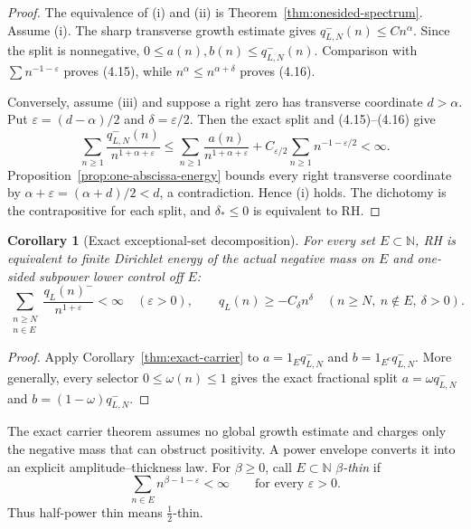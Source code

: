 \documentclass[11pt]{article}
\newtheorem{corollary}[theorem]{Corollary}
\newcommand{\N}{\mathbb N}
\begin{document}
\begin{proof}
The equivalence of (i) and (ii) is Theorem~\ref{thm:onesided-spectrum}.  Assume (i).  The sharp
transverse growth estimate gives $q_{L,N}^-(n)\le Cn^\alpha$.  Since the split is nonnegative,
$0\le a(n),b(n)\le q_{L,N}^-(n)$.  Comparison with $\sum n^{-1-\varepsilon}$ proves
\textup{(4.15)}, while $n^\alpha\le n^{\alpha+\delta}$ proves \textup{(4.16)}.

Conversely, assume (iii) and suppose a right zero has transverse coordinate $d>\alpha$.  Put
$\varepsilon=(d-\alpha)/2$ and $\delta=\varepsilon/2$.  Then the exact split and
\textup{(4.15)}--\textup{(4.16)} give
\[
 \sum_{n\ge1}\frac{q_{L,N}^-(n)}{n^{1+\alpha+\varepsilon}}
 \le
 \sum_{n\ge1}\frac{a(n)}{n^{1+\alpha+\varepsilon}}
 +C_{\varepsilon/2}\sum_{n\ge1}n^{-1-\varepsilon/2}<\infty.
 \tag{4.17}
\]
Proposition~\ref{prop:one-abscissa-energy} bounds every right transverse coordinate by
$\alpha+\varepsilon=(\alpha+d)/2<d$, a contradiction.  Hence (i) holds.  The dichotomy is the
contrapositive for each split, and $\delta_*\le0$ is equivalent to RH.
\end{proof}

\begin{corollary}[Exact exceptional-set decomposition]\label{cor:exceptional-carrier}
For every set $E\subset\N$, RH is equivalent to finite Dirichlet energy of the actual negative
mass on $E$ and one-sided subpower lower control off $E$:
\[
 \sum_{\substack{n\ge N\\n\in E}}
   \frac{q_L(n)^-}{n^{1+\varepsilon}}<\infty
 \quad(\varepsilon>0),
 \qquad
 q_L(n)\ge-C_\delta n^\delta
 \quad(n\ge N,\ n\notin E,\ \delta>0).
\]
\end{corollary}

\begin{proof}
Apply Corollary~\ref{thm:exact-carrier} to
$a=1_Eq_{L,N}^-$ and $b=1_{E^c}q_{L,N}^-$.  More generally, every selector
$0\le\omega(n)\le1$ gives the exact fractional split
$a=\omega q_{L,N}^-$ and $b=(1-\omega)q_{L,N}^-$.
\end{proof}

The exact carrier theorem assumes no global growth estimate and charges only the negative mass
that can obstruct positivity.  A power envelope converts it into an explicit amplitude--thickness
law.  For $\beta\ge0$, call
$E\subset\N$ \emph{$\beta$-thin} if
\[
  \sum_{n\in E}n^{\beta-1-\varepsilon}<\infty
  \qquad\text{for every }\varepsilon>0.
  \tag{4.18}
\]
Thus half-power thin means $\frac12$-thin.
\end{document}
